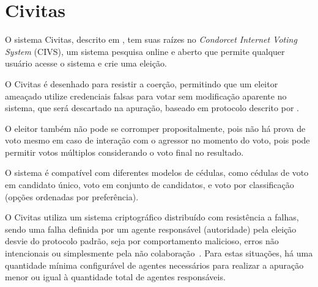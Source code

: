 \section{Civitas}

O sistema Civitas, descrito em \textcite{clarkson2008civitas}, tem suas raízes no \textit{Condorcet Internet Voting System} (CIVS), um sistema pesquisa online e aberto que permite qualquer usuário acesse o sistema e crie uma eleição.

O Civitas é desenhado para resistir a coerção, permitindo que um eleitor ameaçado utilize credenciais falsas para votar sem modificação aparente no sistema, que será descartado na apuração, baseado em protocolo descrito por \textcite{juels2005coercion}.

O eleitor também não pode se corromper propositalmente, pois não há prova de voto mesmo em caso de interação com o agressor no momento do voto, pois pode permitir votos múltiplos considerando o voto final no resultado.

O sistema é compatível com diferentes modelos de cédulas, como cédulas de voto em candidato único, voto em conjunto de candidatos, e voto por classificação (opções ordenadas por preferência).

O Civitas utiliza um sistema criptográfico distribuído com resistência a falhas, sendo uma falha definida por um agente responsável (autoridade) pela eleição desvie do protocolo padrão, seja por comportamento malicioso, erros não intencionais ou simplesmente pela não colaboração~\cite{davis2008civitas}. Para estas situações, há uma quantidade mínima configurável de agentes necessários para realizar a apuração menor ou igual à quantidade total de agentes responsáveis.